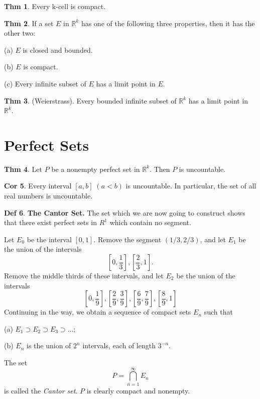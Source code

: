 \documentclass{article}
\theoremstyle{definition}
\newtheorem{definition}{Def}
\newtheorem{theorem}[definition]{Thm}
\newtheorem{corollary}[definition]{Cor}
\begin{document}
\begin{theorem}
    Every k-cell is compact.
\end{theorem}
\begin{theorem}
    If a set $E$ in $\mathbb{R}^k$ has one of the following three properties, then it has the other two:\par
    (a) $E$ is closed and bounded.\par
    (b) $E$ is compact.\par
    (c) Every infinite subset of $E$ has a limit point in $E$.
\end{theorem}
\begin{theorem}
    (Weierstrass). Every bounded infinite subset of $\mathbb{R}^k$ has a limit point in $\mathbb{R}^k$.
\end{theorem}
\section{Perfect Sets}
\begin{theorem}
    Let $P$ be a nonempty perfect set in $\mathbb{R}^k$. Then $P$ is uncountable.
\end{theorem}
\begin{corollary}
    Every interval $[a, b]\;(a<b)$ is uncountable. In particular, the set of all real numbers is uncountable.
\end{corollary}
\begin{definition}
    \textbf{The Cantor Set.} The set which we are now going to construct shows that there exist perfect sets in $\textit{R}^1$ which contain no segment.\par
    Let $E_0$ be the interval $[0, 1]$. Remove the segment $(1/3, 2/3)$, and let $E_1$ be the union of the intervals
    \[
    [0,\frac{1}{3}],[\frac{2}{3},1].
    \]
    Remove the middle thirds of these intervals, and let $E_2$ be the union of the intervals
    \[
    [0,\frac{1}{9}],[\frac{2}{9},\frac{3}{9}],[\frac{6}{9},\frac{7}{9}],[\frac{8}{9},1]
    \]
    Continuing in the way, we obtain a sequence of compact sets $E_n$ such that\par
    (a) $E_1\supset E_2\supset E_3\supset ...$;\par
    (b) $E_n$ is the union of $2^n$ intervals, each of length $3^{-n}$.\par
    \quad The set
    \[
    P=\bigcap_{n=1}^\infty E_n
    \]
    is called the \textit{Cantor set}. $P$ is clearly compact and nonempty.
\end{definition}
\end{document}
